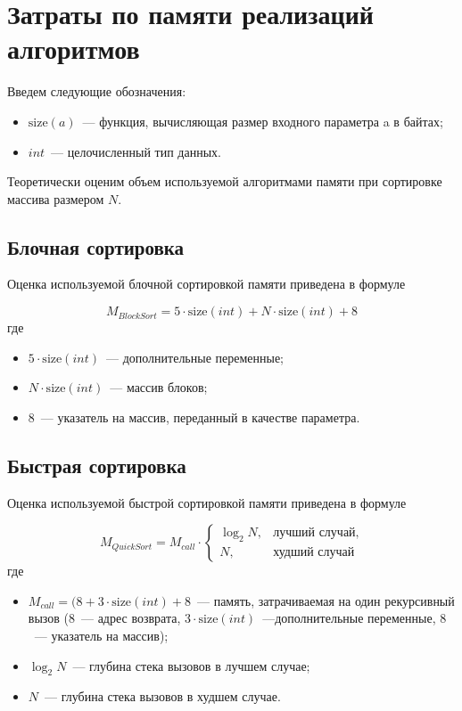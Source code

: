 \section{Затраты по памяти реализаций алгоритмов}

Введем следующие обозначения:
\begin{itemize}
	\item $\text{size}(a)$~--- функция, вычисляющая размер входного параметра a в байтах;
	\item $int$~--- целочисленный тип данных.
\end{itemize}

Теоретически оценим объем используемой алгоритмами памяти при сортировке массива размером $N$.

\subsection{Блочная сортировка}

Оценка используемой блочной сортировкой памяти приведена в формуле

\begin{equation}
	M_{BlockSort} = 5 \cdot \text{size}(int) + N \cdot \text{size}(int) + 8
\end{equation}
где
\begin{itemize}
	\item $5 \cdot \text{size}(int)$~--- дополнительные переменные;
	\item $N \cdot \text{size}(int)$~--- массив блоков;
	\item $8$~--- указатель на массив, переданный в качестве параметра.
\end{itemize}

\subsection{Быстрая сортировка}

Оценка используемой быстрой сортировкой памяти приведена в формуле

\begin{equation}
	\label{eqn:mem-qsort}
	M_{QuickSort} = M_{call} \cdot
	\begin{cases}
		\log_2{N}, & \text{лучший случай}, \\
		N, & \text{худший случай}
	\end{cases}
\end{equation}
где
\begin{itemize}
	\item $M_{call} = (8 + 3 \cdot \text{size}(int) + 8$~--- память, затрачиваемая на один рекурсивный вызов ($8$~--- адрес возврата, $3 \cdot \text{size}(int)$~---дополнительные переменные, $8$~--- указатель на массив);
	\item $\log_2{N}$~--- глубина стека вызовов в лучшем случае;
	\item $N$~--- глубина стека вызовов в худшем случае.
\end{itemize}

